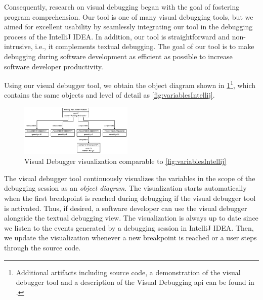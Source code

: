 \documentclass[conference]{IEEEtran}
\newcommand{\intellij}{IntelliJ IDEA}
\begin{document}
Consequently, research on visual debugging began with the goal of fostering program comprehension.
Our tool is one of many visual debugging tools, but we aimed for excellent usability by seamlessly integrating our tool in the debugging process of the \intellij{}.
In addition, our tool is straightforward and non-intrusive, i.e., it complements textual debugging.
The goal of our tool is to make debugging during software development as efficient as possible to increase software developer productivity.

Using our visual debugger tool, we obtain the object diagram shown in \cref{fig:visualDebuggerVariables}\footnote{\label{footnote:artifacts} Additional artifacts including source code, a demonstration of the visual debugger tool and a description of the Visual Debugging \acrshort*{api} can be found in \cite{ArtifactsICSME2022}.}, which contains the same objects and level of detail as \cref{fig:variablesIntellij}.

\begin{figure}[h]
    \centering
    \includegraphics[width=0.48\textwidth]{images/VD-partsList-objects.pdf}
    \caption{Visual Debugger visualization comparable to \cref{fig:variablesIntellij}}
    \label{fig:visualDebuggerVariables}
\end{figure}

The visual debugger tool continuously visualizes the variables in the scope of the debugging session as an \textit{object diagram}.
The visualization starts automatically when the first breakpoint is reached during debugging if the visual debugger tool is activated.
Thus, if desired, a software developer can use the visual debugger alongside the textual debugging view.
The visualization is always up to date since we listen to the events generated by a debugging session in \intellij{}.
Then, we update the visualization whenever a new breakpoint is reached or a user steps through the source code.
\end{document}
